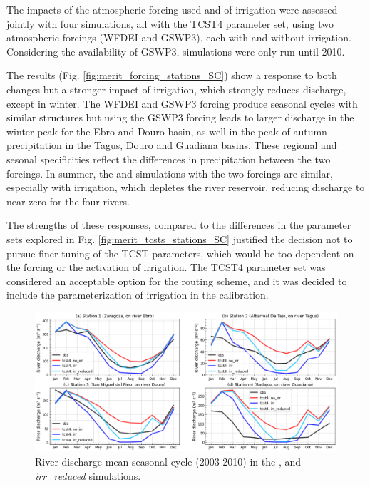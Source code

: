 The impacts of the atmospheric forcing used and of irrigation were assessed jointly with four simulations, all with the TCST4 parameter set, using two atmospheric forcings (WFDEI and GSWP3), each with and without irrigation. Considering the availability of GSWP3, simulations were only run until 2010.

The results (Fig. \ref{fig:merit_forcing_stations_SC}) show a response to both changes but a stronger impact of irrigation, which strongly reduces discharge, except in winter. The WFDEI and GSWP3 forcing produce seasonal cycles with similar structures but using the GSWP3 forcing leads to larger discharge in the winter peak for the Ebro and Douro basin, as well in the peak of autumn precipitation in the Tagus, Douro and Guadiana basins. These regional and sesonal specificities reflect the differences in precipitation between the two forcings. 
In summer, the \noirr and \irr simulations with the two forcings are similar, especially with irrigation, which depletes the river reservoir, reducing discharge to near-zero for the four rivers.

The strengths of these responses, compared to the differences in the parameter sets explored in Fig. \ref{fig:merit_tcsts_stations_SC} justified the decision not to pursue finer tuning of the TCST parameters, which would be too dependent on the forcing or the activation of irrigation. The TCST4 parameter set was considered an acceptable option for the routing scheme, and it was decided to include the parameterization of irrigation in the calibration. 

\begin{figure}[htbp]
    \centering
    \includegraphics[width=\textwidth]{images/chap3/river_discharge/merit_irr_4stations_SC.png}
    \caption{River discharge mean seasonal cycle (2003-2010) in the \noirr, \irr and \textit{irr\_reduced} simulations.}
    \label{fig:merit_irr_stations_SC}
\end{figure}

